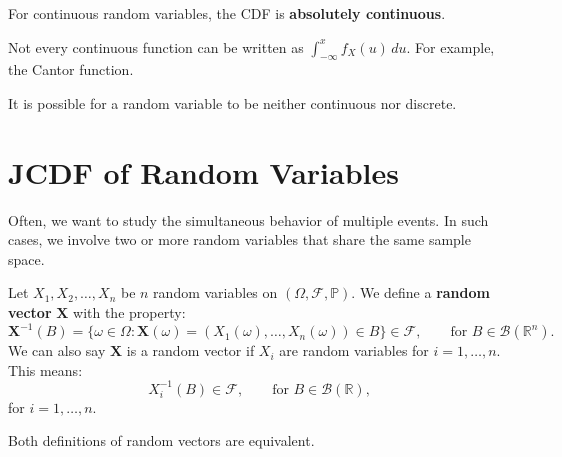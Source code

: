 \documentclass{huhtakm-template-book-v2}
\newcommand{\prob}{\mathbb{P}}
\begin{document}
    \begin{rem}
        For continuous random variables, the CDF is \textbf{absolutely continuous}.
    \end{rem}
    \begin{rem}
        Not every continuous function can be written as $\int_{-\infty}^{x}f_{X}(u)\,du$. For example, the Cantor function.
    \end{rem}
    \begin{rem}
        It is possible for a random variable to be neither continuous nor discrete.
    \end{rem}
    \newpage 

\section{JCDF of Random Variables}
    Often, we want to study the simultaneous behavior of multiple events. In such cases, we involve two or more random variables that share the same sample space.
    \begin{defn}
        Let $X_{1},X_{2},\dots,X_{n}$ be $n$ random variables on $(\Omega,\mathcal{F},\prob)$. We define a \textbf{random vector} $\mathbf{X}$ with the property:
        \begin{equation*}
            \mathbf{X}^{-1}(B) = \{\omega \in \Omega:\mathbf{X}(\omega) = (X_{1}(\omega),\dots,X_{n}(\omega)) \in B\} \in \mathcal{F}, \qquad\text{for }B \in \mathcal{B}(\mathbb{R}^{n}).
        \end{equation*}
        We can also say $\mathbf{X}$ is a random vector if $X_{i}$ are random variables for $i = 1,\dots,n$. This means:
        \begin{equation*}
            X_{i}^{-1}(B) \in \mathcal{F}, \qquad \text{for }B \in \mathcal{B}(\mathbb{R}),
        \end{equation*}
        for $i = 1,\dots,n$.
    \end{defn}
    \begin{cla}
        Both definitions of random vectors are equivalent.
    \end{cla}
\end{document}
